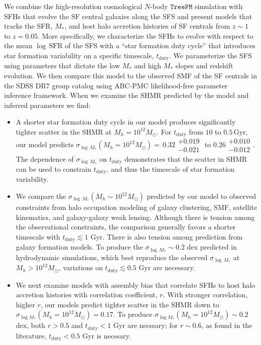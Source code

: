 \documentclass[12pt, letterpaper, preprint, tighten]{aastex62}
\newcommand{\bitem}{\begin{itemize}}
\newcommand{\eitem}{\end{itemize}}
\begin{document}
We combine the high-resolution cosmological $N$-body $\mathtt{TreePM}$ simulation
with SFHs that evolve the SF central galaxies along the SFS and present models
that tracks the SFR, $M_*$, and host halo accretion histories of SF centrals from 
$z \sim 1$ to $z=0.05$. More specifically, we characterize the SFHs to evolve with
respect to the mean $\log\,\mathrm{SFR}$ of the SFS with a ``star formation duty cycle'' 
that introduces star formation variability on a specific timescale, $t_\mathrm{duty}$. 
We parameterize the SFS using parameters that dictate the low $M_*$ and high $M_*$ 
slopes and redshift evolution. We then compare this model to the observed SMF of the 
SF centrals in the SDSS DR7 group catalog using ABC-PMC likelihood-free parameter 
inference framework. When we examine the SHMR predicted by the model and inferred 
parameters we find:
\bitem
\item A shorter star formation duty cycle in our model produces significantly
    tighter scatter in the SHMR at $M_h = 10^{12} M_\odot$. For
    $t_\mathrm{duty}$ from $10$ to $0.5\,\mathrm{Gyr}$, our model predicts
    $\sigma_{\log\,M_*}(M_h=10^{12}M_\odot){=}\,0.32\substack{+0.019\\ -0.021}$ to $0.26\substack{+0.010\\-0.012}$.
    The dependence of $\sigma_{\log\,M_*}$ on $t_\mathrm{duty}$ demonstrates that
    the scatter in SHMR can be used to constrain $t_\mathrm{duty}$, and thus  
    the timescale of star formation variability.

\item We compare the $\sigma_{\log\,M_*}(M_h\sim10^{12}M_\odot)$ predicted by our
    model to observed constraints from halo occupation modeling of galaxy clustering, 
    SMF, satellite kinematics, and galaxy-galaxy weak lensing. Although there is tension 
    among the observational constraints, the comparison generally favors a shorter
    timescale with $t_\mathrm{duty} \lesssim 1$ Gyr. There is also tension among
    prediction from galaxy formation models. To produce the $\sigma_{\log\,M_*}\sim 0.2$ dex
    predicted in hydrodynamic simulations, which best reproduce the observed
    $\sigma_{\log\,M_*}$ at $M_h>10^{12}M_\odot$, variations on 
    $t_\mathrm{duty} \lesssim 0.5$ Gyr are necessary.

\item We next examine models with assembly bias that correlate SFHs to host halo 
    accretion histories with correlation coefficient, $r$. With stronger correlation, 
    higher $r$, our models predict tighter scatter in the SHMR down to $\sigma_{\log M_*}(M_h=10^{12}M_\odot){=}0.17$.
    To produce $\sigma_{\log M_*}(M_h=10^{12}M_\odot)\sim 0.2$ dex, both $r > 0.5$ 
    and $t_\mathrm{duty} < 1$ Gyr are necssary; for $r \sim 0.6$, as found in the 
    literature, $t_\mathrm{duty} < 0.5$ Gyr is necssary.
\eitem
\end{document}

